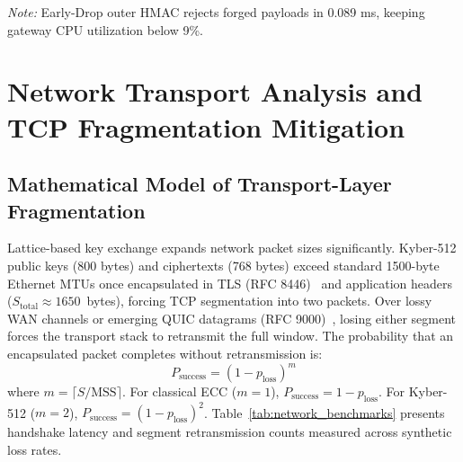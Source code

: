 \documentclass[sn-mathphys,Numbered]{sn-jnl}%
\theoremstyle{thmstyleone}%
\theoremstyle{thmstyletwo}%
\theoremstyle{thmstylethree}%
\begin{document}
\begin{table}[!htbp]
\centering
\caption{Denial-of-Service early-drop rejection latency and speedup dynamics.}
\label{tab:dos_benchmarks}
\vspace{0.3em}
\raggedright\small\textit{Note:} Early-Drop outer HMAC rejects forged payloads in 0.089 ms, keeping gateway CPU utilization below 9\%.
\end{table}

\section{Network Transport Analysis and TCP Fragmentation Mitigation}\label{sec:transport}

\subsection{\textbf{Mathematical Model of Transport-Layer Fragmentation}}
Lattice-based key exchange expands network packet sizes significantly. Kyber-512 public keys (800 bytes) and ciphertexts (768 bytes) exceed standard 1500-byte Ethernet MTUs once encapsulated in TLS (RFC 8446)~\cite{rescorla2018tls} and application headers ($S_{\text{total}} \approx 1650$~bytes), forcing TCP segmentation into two packets. Over lossy WAN channels or emerging QUIC datagrams (RFC 9000)~\cite{iyengar2021quic}, losing either segment forces the transport stack to retransmit the full window. The probability that an encapsulated packet completes without retransmission is:
\begin{equation}
P_{\text{success}} = (1 - p_{\text{loss}})^m
\end{equation}
where $m = \lceil S / \text{MSS} \rceil$. For classical ECC ($m=1$), $P_{\text{success}} = 1 - p_{\text{loss}}$. For Kyber-512 ($m=2$), $P_{\text{success}} = (1 - p_{\text{loss}})^2$. Table~\ref{tab:network_benchmarks} presents handshake latency and segment retransmission counts measured across synthetic loss rates.
\end{document}
